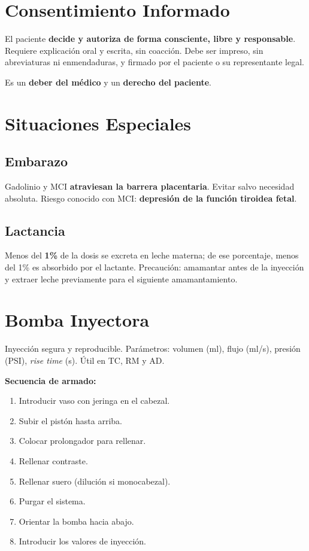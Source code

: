 {\section*{Consentimiento Informado}

El paciente \textbf{decide y autoriza de forma consciente, libre y responsable}. Requiere explicación oral y escrita, sin coacción. Debe ser impreso, sin abreviaturas ni enmendaduras, y firmado por el paciente o su representante legal.

Es un \textbf{deber del médico} y un \textbf{derecho del paciente}.

\clearpage

\section*{Situaciones Especiales}

\subsection*{Embarazo}
Gadolinio y MCI \textbf{atraviesan la barrera placentaria}. Evitar salvo necesidad absoluta. Riesgo conocido con MCI: \textbf{depresión de la función tiroidea fetal}.

\subsection*{Lactancia}
Menos del \textbf{1\%} de la dosis se excreta en leche materna; de ese porcentaje, menos del 1\% es absorbido por el lactante. Precaución: amamantar antes de la inyección y extraer leche previamente para el siguiente amamantamiento.

\section*{Bomba Inyectora}

Inyección segura y reproducible. Parámetros: volumen (ml), flujo (ml/s), presión (PSI), \textit{rise time} (s). Útil en TC, RM y AD.

\textbf{Secuencia de armado:}
\begin{enumerate}[noitemsep]
  \item Introducir vaso con jeringa en el cabezal.
  \item Subir el pistón hasta arriba.
  \item Colocar prolongador para rellenar.
  \item Rellenar contraste.
  \item Rellenar suero (dilución si monocabezal).
  \item Purgar el sistema.
  \item Orientar la bomba hacia abajo.
  \item Introducir los valores de inyección.
\end{enumerate}

}
